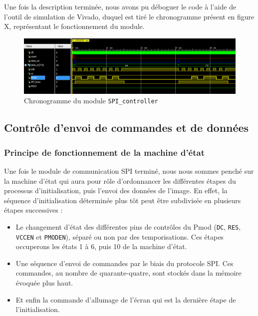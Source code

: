 \documentclass[11pt]{article}
\begin{document}
Une fois la description terminée, nous avons pu déboguer le code à l'aide de l'outil de simulation de Vivado, duquel est tiré le chronogramme présent en figure X, représentant le fonctionnement du module.

\begin{figure}[H]
\begin{center}
\includegraphics[scale = 0.3, keepaspectratio]{chrono_SPI_controller.png}
\caption{Chronogramme du module \texttt{SPI\_controller}}
\end{center}
\end{figure}

\subsection{Contrôle d'envoi de commandes et de données}

\subsubsection{Principe de fonctionnement de la machine d'état}

Une fois le module de communication SPI terminé, nous nous sommes penché sur la machine d'état qui aura pour rôle d'ordonnancer les différentes étapes du processus d'initialisation, puis l'envoi des données de l'image. En effet, la séquence d'initialisation déterminée plus tôt peut être subdivisée en plusieurs étapes successives :

\begin{itemize}

\item[\textbullet] Le changement d'état des différentes pins de contrôles du Pmod (\texttt{DC}, \texttt{RES}, \texttt{VCCEN} et \texttt{PMODEN}), séparé ou non par des temporisations. Ces étapes occuperons les états 1 à 6, puis 10 de la machine d'état.

\item[\textbullet] Une séquence d'envoi de commandes par le biais du protocole SPI. Ces commandes, au nombre de quarante-quatre, sont stockés dans la mémoire évoquée plus haut.

\item[\textbullet] Et enfin la commande d'allumage de l'écran qui est la dernière étape de l'initialisation.

\end{itemize}
\end{document}
